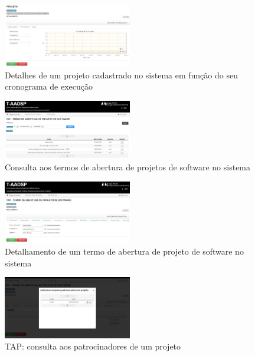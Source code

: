 \documentclass{acm_proc_article-sp}
\begin{document}
\begin{appendices}
\begin{figure}[h]
\centering %
\includegraphics[width=0.5\textwidth]{RF_detalhamento_Projeto_Cronograma.jpg} %
\caption{Detalhes de um projeto cadastrado no sistema em função do seu cronograma de execução}
\end{figure}

\begin{figure}[h]
\centering %
\includegraphics[width=0.5\textwidth]{RF_TAPConsulta.jpg} %
\caption{Consulta aos termos de abertura de projetos de software no sistema}
\end{figure}

\begin{figure}[h]
\centering %
\includegraphics[width=0.5\textwidth]{RF_TAPDetalhamento.jpg} %
\caption{Detalhamento de um termo de abertura de projeto de software no sistema}
\end{figure}

\begin{figure}[h]
\centering %
\includegraphics[width=0.5\textwidth]{RF_TAPDetalhamento_addPatrocinador.jpg} %
\caption{TAP: consulta aos patrocinadores de um projeto}
\end{figure}


\end{appendices}
\end{document}
